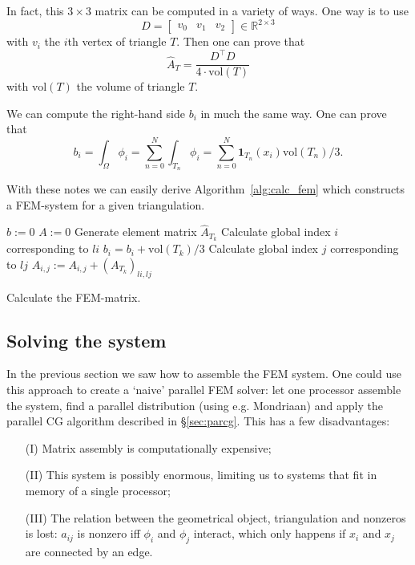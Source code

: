 \documentclass[11pt]{amsart}
\theoremstyle{definition}
\newcommand{\R}{\mathbb{R}}
\begin{document}
In fact, this $3 \times 3$ matrix can be computed in a variety of ways. One way is to use
\[
  D = \begin{bmatrix} v_{0} & v_{1} & v_{2} \end{bmatrix} \in \R^{ 2 \times 3}
\]
with $v_{i}$ the $i$th vertex of triangle $T$. Then one can prove \cite{TODO} that
\[
  \hat A_T = \frac{D^\top D}{4 \cdot \text{vol}(T)}
\]
with $\text{vol}(T)$ the volume of triangle $T$.

We can compute the right-hand side $b_i$ in much the same way. One can prove \cite{TODOjan} that
\[
  b_i = \int_\Omega \phi_i = \sum_{n=0}^N \int_{T_n} \phi_i
	= \sum_{n=0}^N \mathbf{1}_{T_n}(x_i)\text{vol}(T_n)/3.
\]

With these notes we can easily derive Algorithm~\ref{alg:calc_fem} which constructs a FEM-system for a given triangulation.

\begin{algorithm}[H]
	$b := 0$\;
	$A := 0$\;
	 {
		Generate element matrix $\hat A_{T_k}$\;
		 {
			Calculate global index $i$ corresponding to $li$\;
			 {
				$b_i = b_i + \text{vol}(T_k)/3$\;
				 {
					Calculate global index $j$ corresponding to $lj$\;
					 {
						$A_{i,j} := A_{i,j} + (A_{T_k})_{li,lj}$\;
					}
				}
			}
		}
	}
 \caption{Calculate the FEM-matrix.}
 \label{alg:calc_fem}
\end{algorithm}
\subsection{Solving the system}
In the previous section we saw how to assemble the FEM system. One could use this approach to create a `naive' parallel FEM solver: let one processor assemble the system, find a parallel distribution (using e.g. Mondriaan) and apply the parallel CG algorithm described in \S\ref{sec:parcg}. This has a few disadvantages:
\begin{enumerate}
  \item[(I)] Matrix assembly is computationally expensive;
  \item[(II)] This system is possibly enormous, limiting us to systems that fit in memory of a single processor;
  \item[(III)] The relation between the geometrical object, triangulation and nonzeros is lost: $a_{ij}$ is nonzero iff $\phi_i$ and $\phi_j$ interact, which only happens if $x_i$ and $x_j$ are connected by an edge.
\end{enumerate}
\end{document}
